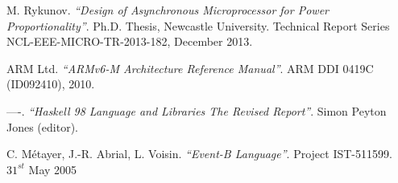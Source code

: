 \documentclass[conference]{IEEEtran}
\begin{document}
\begin{thebibliography}{1}
	M. Rykunov. \emph{``Design of Asynchronous Microprocessor for Power
	Proportionality''}. Ph.D. Thesis, Newcastle University. Technical Report Series
	NCL-EEE-MICRO-TR-2013-182, December 2013.
	
	ARM Ltd. \emph{``ARMv6-M Architecture Reference Manual''}. 
	ARM DDI 0419C (ID092410), 2010.
	
	----. \emph{``Haskell 98 Language and Libraries The Revised Report''}. 
	Simon Peyton Jones (editor).
	
	C. Métayer, J.-R. Abrial, L. Voisin. \emph{``Event-B Language''}. 
	Project IST-511599. $31^{st}$ May 2005
	
\end{thebibliography}
\end{document}
